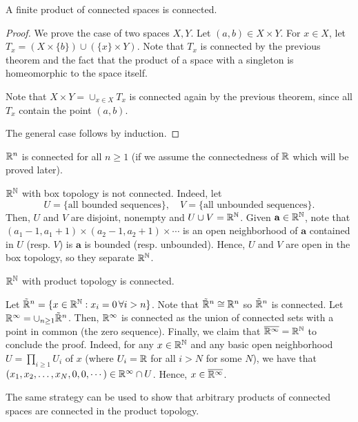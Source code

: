 \begin{theorem}
    A finite product of connected spaces is connected.
\end{theorem}
\begin{proof}
    We prove the case of two spaces $X,Y$. Let $(a,b)\in X\times Y$. For $x\in X$, let $T_x=(X\times \{b\})\cup (\{x\}\times Y)$. Note that $T_x$ is connected by the previous theorem and the fact that the product of a space with a singleton is homeomorphic to the space itself.

    Note that $X\times Y=\cup_{x\in X}T_x$ is connected again by the previous theorem, since all $T_x$ contain the point $(a,b)$.

    The general case follows by induction.
\end{proof}

\begin{example}
    $\mathbb{R}^n$ is connected for all $n\geq 1$ (if we assume the connectedness of $\mathbb{R}$ which will be proved later).
\end{example}

\begin{example}
    $\mathbb{R}^{\mathbb{N}}$ with box topology is not connected. Indeed, let
    \[U=\{\text{all bounded sequences}\},\quad V=\{\text{all unbounded sequences}\}.\]
    Then, $U$ and $V$ are disjoint, nonempty and $U\cup V=\mathbb{R}^{\mathbb{N}}$. Given $\mathbf{a}\in \mathbb{R}^{\mathbb{N}}$, note that $(a_1-1,a_1+1)\times (a_2-1,a_2+1)\times\cdots$ is an open neighborhood of $\mathbf{a}$ contained in $U$ (resp. $V$) is $\mathbf{a}$ is bounded (resp. unbounded). Hence,  $U$ and $V$ are open in the box topology, so they separate $\mathbb{R}^{\mathbb{N}}$.
\end{example}

\begin{example}
    $\mathbb{R}^{\mathbb{N}}$ with product topology is connected. 
    
    Let $\tilde{\mathbb{R}}^n=\{x\in\mathbb{R}^{\mathbb{N}}:x_i=0\,\forall i>n\}$.
    Note that $\tilde{\mathbb{R}}^n\cong \mathbb{R}^n$ so $\tilde{\mathbb{R}}^n$ is connected. Let $\mathbb{R}^\infty=\cup_{n\geq 1}\tilde{\mathbb{R}}^n$. Then, $\mathbb{R}^\infty$ is connected as the union of connected sets with a point in common (the zero sequence). Finally, we claim that $\overline{\mathbb{R}^\infty}=\mathbb{R}^{\mathbb{N}}$ to conclude the proof. Indeed, for any $x\in\mathbb{R}^{\mathbb{N}}$ and any basic open neighborhood $U=\prod_{i\geq 1}U_i$ of $x$ (where $U_i=\mathbb{R}$ for all $i>N$ for some $N$), we have that $(x_1,x_2,\ldots,x_N,0,0,\cdots)\in \mathbb{R}^\infty\cap U$. Hence, $x\in\overline{\mathbb{R}^\infty}$.
\end{example}

The same strategy can be used to show that arbitrary products of connected spaces are connected in the product topology.


